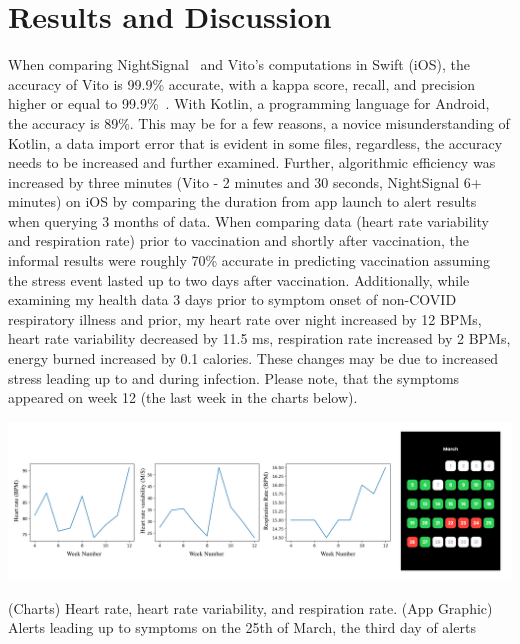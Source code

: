 \documentclass{article}
\begin{document}
\section{Results and Discussion}
When comparing NightSignal~\cite{NightSignalGithub} and Vito's computations in Swift (iOS), the accuracy of Vito is 99.9\% accurate, with a kappa score, recall, and precision higher or equal to 99.9\%~\cite{VitoAnalysis}.  With Kotlin, a programming language for Android, the accuracy is 89\%.  This may be for a few reasons, a novice misunderstanding of Kotlin, a data import error that is evident in some files, regardless, the accuracy needs to be increased and further examined.  Further, algorithmic efficiency was increased by three minutes (Vito - 2 minutes and 30 seconds, NightSignal 6+ minutes) on iOS by comparing the duration from app launch to alert results when querying 3 months of data. When comparing data (heart rate variability and respiration rate) prior to vaccination and shortly after vaccination, the informal results were roughly 70\% accurate in predicting vaccination assuming the stress event lasted up to two days after vaccination.  Additionally, while examining my health data 3 days prior to symptom onset of non-COVID respiratory illness and prior, my heart rate over night increased by 12 BPMs, heart rate variability decreased by 11.5 ms, respiration rate increased by 2 BPMs, energy burned increased by 0.1 calories.  These changes may be due to increased stress leading up to and during infection.  Please note, that the symptoms appeared on week 12 (the last week in the charts below).

\includegraphics[scale=0.07]{VitoInfo.png}

\caption {
(Charts) Heart rate, heart rate variability, and respiration rate. 
(App Graphic) Alerts leading up to symptoms on the 25th of March, the third day of alerts
}

\end{document}
